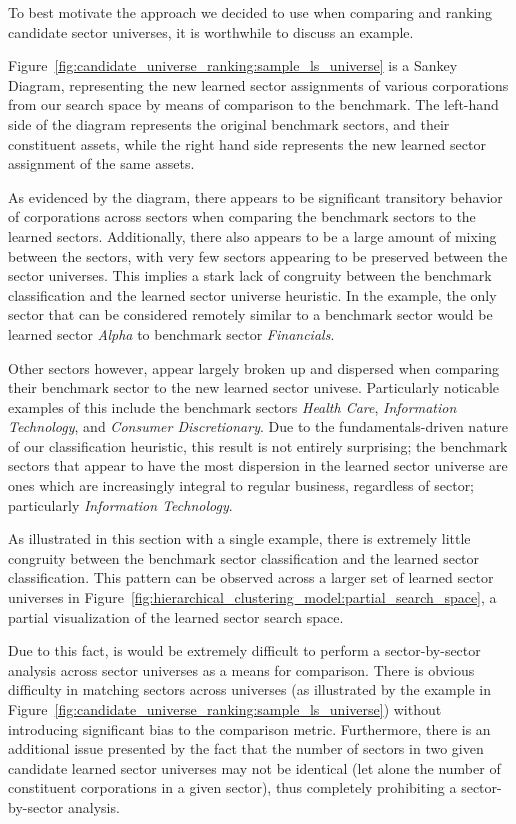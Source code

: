 \documentclass[../main.tex]{subfiles}
\begin{document}
To best motivate the approach we decided to use when comparing and ranking candidate sector universes, it is worthwhile to discuss an example.

Figure~\ref{fig:candidate_universe_ranking:sample_ls_universe} is a Sankey Diagram, representing the new learned sector assignments of various corporations from our search space by means of comparison to the benchmark. The left-hand side of the diagram represents the original benchmark sectors, and their constituent assets, while the right hand side represents the new learned sector assignment of the same assets.

As evidenced by the diagram, there appears to be significant transitory behavior of corporations across sectors when comparing the benchmark sectors to the learned sectors. Additionally, there also appears to be a large amount of mixing between the sectors, with very few sectors appearing to be preserved between the sector universes. This implies a stark lack of congruity between the benchmark classification and the learned sector universe heuristic. In the example, the only sector that can be considered remotely similar to a benchmark sector would be learned sector \textit{Alpha} to benchmark sector \textit{Financials}.

Other sectors however, appear largely broken up and dispersed when comparing their benchmark sector to the new learned sector univese. Particularly noticable examples of this include the benchmark sectors \textit{Health Care}, \textit{Information Technology}, and \textit{Consumer Discretionary}. Due to the fundamentals-driven nature of our classification heuristic, this result is not entirely surprising; the benchmark sectors that appear to have the most dispersion in the learned sector universe are ones which are increasingly integral to regular business, regardless of sector; particularly \textit{Information Technology}.

As illustrated in this section with a single example, there is extremely little congruity between the benchmark sector classification and the learned sector classification. This pattern can be observed across a larger set of learned sector universes in Figure~\ref{fig:hierarchical_clustering_model:partial_search_space}, a partial visualization of the learned sector search space.

Due to this fact, is would be extremely difficult to perform a sector-by-sector analysis across sector universes as a means for comparison. There is obvious difficulty in matching sectors across universes (as illustrated by the example in Figure~\ref{fig:candidate_universe_ranking:sample_ls_universe}) without introducing significant bias to the comparison metric. Furthermore, there is an additional issue presented by the fact that the number of sectors in two given candidate learned sector universes may not be identical (let alone the number of constituent corporations in a given sector), thus completely prohibiting a sector-by-sector analysis.
\end{document}
